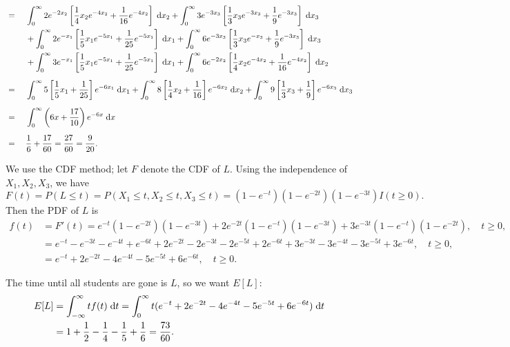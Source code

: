 \documentclass{homework}
\begin{document}
\begin{alphaparts}
\begin{alignat*}{2}
		&={}&& \int_0^\infty  2e^{-2x_2} \left[\frac{1}{4}x_2e^{-4x_2} + \frac{1}{16} e^{-4x_2}\right] \;\text{d} x_2 + \int_0^\infty 3e^{-3x_3} \left[\frac{1}{3}x_3e^{-3x_3} + \frac{1}{9}e^{-3x_3}\right]\;\text{d} x_3 \\
		&&&{}+ \int_0^\infty 2e^{-x_1}\left[\frac{1}{5}x_1e^{-5x_1} + \frac{1}{25}e^{-5x_1}\right] \;\text{d} x_1 + \int_0^\infty 6e^{-3x_3}\left[\frac{1}{3}x_3e^{-x_3} + \frac{1}{9}e^{-3x_3}\right] \;\text{d} x_3 \\
		&&&{}+ \int_0^\infty 3e^{-x_1}\left[\frac{1}{5}x_1e^{-5x_1} + \frac{1}{25}e^{-5x_1}\right] \;\text{d} x_1 + \int_0^\infty 6e^{-2x_2} \left[\frac{1}{4}x_2e^{-4x_2} + \frac{1}{16}e^{-4x_2}\right] \;\text{d} x_2 \\[0.5em]
		&={}&& \int_0^\infty 5\left[\frac{1}{5}x_1 + \frac{1}{25}\right]e^{-6x_1}\;\text{d} x_1 + \int_0^\infty  8\left[\frac{1}{4}x_2 + \frac{1}{16}\right]e^{-6x_2} \;\text{d} x_2 + \int_0^\infty 9 \left[\frac{1}{3}x_3 + \frac{1}{9}\right] e^{-6x_3}\;\text{d} x_3 \\[0.5em]
			&={}&& \int_0^\infty \left(6x + \frac{17}{10}\right)e^{-6x}\;\text{d} x \\[0.5em]
			&={}&& \frac{1}{6} + \frac{17}{60} = \frac{27}{60} = \frac{9}{20}.
		\end{alignat*}
	
	\questionpart We use the CDF method; let $F$ denote the CDF of $L$. Using the independence of $X_1, X_2, X_3$, we have
	\begin{equation*}
		F(t) = P(L \le t) = P(X_1 \le t, X_2 \le t, X_3 \le t) = (1-e^{-t})(1-e^{-2t})(1-e^{-3t})I(t \ge 0).
	\end{equation*}
	Then the PDF of $L$ is
	\begin{align*}
		f(t) &= F'(t) = e^{-t}(1-e^{-2t})(1-e^{-3t}) +2e^{-2t}(1-e^{-t})(1-e^{-3t}) + 3e^{-3t}(1-e^{-t})(1-e^{-2t}), \quad t \ge 0, \\
		&= e^{-t} - e^{-3t} - e^{-4t} + e^{-6t} + 2e^{-2t} - 2e^{-3t} -2e^{-5t} + 2e^{-6t} + 3e^{-3t} - 3e^{-4t} -3e^{-5t} + 3e^{-6t}, \quad t \ge 0,\\
		&=  e^{-t} + 2e^{-2t} - 4e^{-4t} -5 e^{-5t} + 6e^{-6t}, \quad t \ge 0.
	\end{align*}
	
	\questionpart The time until all students are gone is $L$, so we want $E[L]$:
	\begin{align*}
		E[L] &= \int_{-\infty}^\infty tf(t)\;\text{d} t = \int_0^\infty t(e^{-t} + 2e^{-2t} - 4e^{-4t} -5 e^{-5t} + 6e^{-6t})\;\text{d} t \\
		&= 1 + \frac{1}{2} - \frac{1}{4} - \frac{1}{5} + \frac{1}{6} = \frac{73}{60}.
	\end{align*}
	\end{alphaparts}
	
\end{document}
